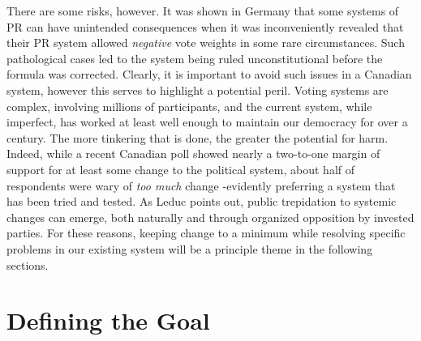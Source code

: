 There are some risks, however. It was shown in Germany that some systems of PR can have unintended consequences when it was inconveniently revealed that their PR system allowed \emph{negative} vote weights in some rare circumstances\citep{Die_Zeit_negative_vote}.
Such pathological cases led to the system being ruled unconstitutional before the formula was corrected.
Clearly, it is important to avoid such issues in a Canadian system, however this serves to highlight a potential peril.
Voting systems are complex, involving millions of participants, and the current system, while imperfect, has worked at least well enough to maintain our democracy for over a century.
The more tinkering that is done, the greater the potential for harm.
Indeed, while a recent Canadian poll\citep{Broadbent_poll} showed nearly a two-to-one margin of support for at least some change to the political system, about half of respondents were wary of \emph{too much} change \--evidently preferring a system that has been tried and tested.
As Leduc points out\citep{Leduc}, public trepidation to systemic changes can emerge, both naturally and through organized opposition by invested parties.
For these reasons, keeping change to a minimum while resolving specific problems in our existing system will be a principle theme in the following sections.


\section{Defining the Goal}
\label{sec:goal_list}

